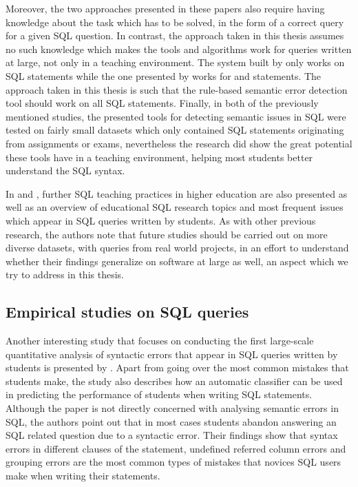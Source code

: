 Moreover, the two approaches presented in these papers also require having knowledge about the task which has to be solved, in the form of  a correct query for a given SQL question. In contrast, the approach taken in this thesis assumes no such knowledge which makes the tools and algorithms work for queries written at large, not only in a teaching environment. The system built by \citet{P004} only works on  SQL statements while the one presented by \citet{P005} works for  and  statements. The approach taken in this thesis is such that the rule-based semantic error detection tool should work on all SQL statements. Finally, in both of the previously mentioned studies, the presented tools for detecting semantic issues in SQL were tested on fairly small datasets which only contained SQL statements originating from assignments or exams, nevertheless the research did show the great potential these tools have in a teaching environment, helping most students better understand the SQL syntax.

In \citet{P017} and \citet{P036}, further SQL teaching practices in higher education are also presented as well as an overview of educational SQL research topics and most frequent issues which appear in SQL queries written by students. As with other previous research, the authors note that future studies should be carried out on more diverse datasets, with queries from real world projects, in an effort to understand whether their findings generalize on software at large as well, an aspect which we try to address in this thesis.

\subsection{Empirical studies on SQL queries}

Another interesting study that focuses on conducting the first large-scale quantitative analysis of syntactic errors that appear in SQL queries written by students is presented by \citet{P008}. Apart from going over the most common mistakes that students make, the study also describes how an automatic classifier can be used in predicting the performance of students when writing SQL statements. Although the paper is not directly concerned with analysing semantic errors in SQL, the authors point out that in most cases students abandon answering an SQL related question due to a syntactic error. Their findings show that syntax errors in different clauses of the  statement, undefined referred column errors and grouping errors are the most common types of mistakes that novices SQL users make when writing their statements. 

